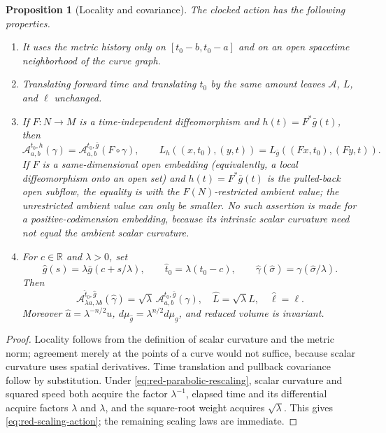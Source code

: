 \documentclass[10pt]{coll-l}
\newtheorem{proposition}[theorem]{Proposition}
\theoremstyle{definition}
\theoremstyle{remark}
\numberwithin{section}{chapter}
\numberwithin{equation}{chapter}
\begin{document}
\begin{proposition}[Locality and covariance]
\label{prop:red-covariance}
The clocked action has the following properties.
\begin{enumerate}
\item It uses the metric history only on $[t_0-b,t_0-a]$ and on an open
      spacetime neighborhood of the curve graph.
\item Translating forward time and translating $t_0$ by the same amount
      leaves $\mathcal A$, $L$, and $\ell$ unchanged.
\item If $F:N\to M$ is a time-independent diffeomorphism and
      $h(t)=F^*\bar g(t)$, then
\begin{equation}
 \mathcal A^{t_0,h}_{a,b}(\gamma)
  =\mathcal A^{t_0,\bar g}_{a,b}(F\circ\gamma),
 \qquad
 L_h((x,t_0),(y,t))=L_{\bar g}((Fx,t_0),(Fy,t)).         \label{eq:red-pullback-covariance}
\end{equation}
If $F$ is a same-dimensional open embedding (equivalently, a local
diffeomorphism onto an open set) and $h(t)=F^*\bar g(t)$ is the pulled-back
open subflow, the equality is with the $F(N)$-restricted ambient value; the
unrestricted ambient value can only be smaller.  No such assertion is made
for a positive-codimension embedding, because its intrinsic scalar
curvature need not equal the ambient scalar curvature.
\item For $c\in\mathbb R$ and $\lambda>0$, set
\begin{equation}
 \widehat g(s)=\lambda\bar g(c+s/\lambda),
 \qquad \widehat t_0=\lambda(t_0-c),
 \qquad \widehat\gamma(\widehat\sigma)
       =\gamma(\widehat\sigma/\lambda).                 \label{eq:red-parabolic-rescaling}
\end{equation}
Then
\begin{equation}
 \mathcal A^{\widehat t_0,\widehat g}_{\lambda a,\lambda b}
       (\widehat\gamma)=\sqrt\lambda\,
       \mathcal A^{t_0,\bar g}_{a,b}(\gamma),
 \quad \widehat L=\sqrt\lambda L,
 \quad \widehat\ell=\ell.                             \label{eq:red-scaling-action}
\end{equation}
Moreover $\widehat u=\lambda^{-n/2}u$,
$d\mu_{\widehat g}=\lambda^{n/2}d\mu_g$, and reduced volume is invariant.
\end{enumerate}
\end{proposition}

\begin{proof}
Locality follows from the definition of scalar curvature and the metric norm;
agreement merely at the points of a curve would not suffice, because scalar
curvature uses spatial derivatives.  Time translation and pullback
covariance follow by substitution.  Under \eqref{eq:red-parabolic-rescaling},
scalar curvature and squared speed both acquire the factor $\lambda^{-1}$,
elapsed time and its differential acquire factors $\lambda$ and $\lambda$,
and the square-root weight acquires $\sqrt\lambda$.  This gives
\eqref{eq:red-scaling-action}; the remaining scaling laws are immediate.
\end{proof}
\end{document}

